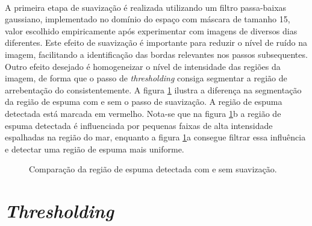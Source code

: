 \paragraph{}A primeira etapa de suavização é realizada utilizando um filtro passa-baixas gaussiano, implementado no domínio do espaço com máscara de tamanho 15, valor escolhido empiricamente após experimentar com imagens de diversos dias diferentes. Este efeito de suavização é importante para reduzir o nível de ruído na imagem, facilitando a identificação das bordas relevantes nos passos subsequentes. Outro efeito desejado é homogeneizar o nível de intensidade das regiões da imagem, de forma que o passo de \textit{thresholding} consiga segmentar a região de arrebentação do \timestack consistentemente. A figura \ref{FigGaussianBlurComparison} ilustra a diferença na segmentação da região de espuma com e sem o passo de suavização. A região de espuma detectada está marcada em vermelho. Nota-se que na figura \ref{FigGaussianBlurComparison}b a região de espuma detectada é influenciada por pequenas faixas de alta intensidade espalhadas na região do mar, enquanto a figura \ref{FigGaussianBlurComparison}a consegue filtrar essa influência e detectar uma região de espuma mais uniforme.

\begin{figure}[h]
  \centering
  \qquad
  \caption[\small{Comparação da região de espuma detectada com e sem suavização.}]{\small{Comparação da região de espuma detectada com e sem suavização.}}
  \label{FigGaussianBlurComparison} 
\end{figure}


\section{\textit{Thresholding}}

